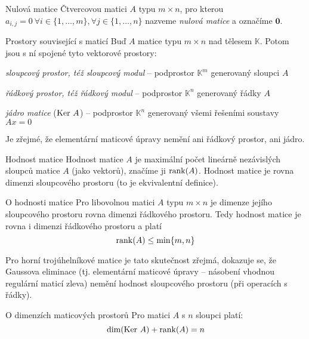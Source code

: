 \begin{definiceN}{Nulová matice}
Čtvercovou matici $A$ typu $m\times n$, pro kterou $a_{i,j}=0\ \forall i\in\{1,\dots,m\},\forall j\in\{1,\dots,n\}$ nazveme \emph{nulová matice} a označíme $\mathbf{0}$.
\end{definiceN}



\begin{definiceN}{Prostory související s maticí}
Buď $A$ matice typu $m\times n$ nad tělesem $\mathbb{K}$. Potom jsou s ní spojené tyto vektorové prostory:
\begin{pitemize}
    \item \emph{sloupcový prostor, též sloupcový modul} -- podprostor $\mathbb{K}^m$ generovaný sloupci $A$
    \item \emph{řádkový prostor, též řádkový modul} -- podprostor $\mathbb{K}^n$ generovaný řádky $A$
    \item \emph{jádro matice} ($\mathrm{Ker\ } A$) -- podprostor $\mathbb{K}^n$ generovaný všemi řešeními soustavy $Ax=0$
\end{pitemize}

\noindent Je zřejmé, že elementární maticové úpravy nemění ani řádkový prostor, ani jádro.
\end{definiceN}

\begin{definiceN}{Hodnost matice}
Hodnost matice $A$ je maximální počet lineárně nezávislých sloupců matice $A$ (jako vektorů), značíme ji $\mathrm{rank}(A)$. Hodnost matice je rovna dimenzi sloupcového prostoru (to je ekvivalentní definice).
\end{definiceN}

\begin{vetaN}{O hodnosti matice}
Pro libovolnou matici $A$ typu $m\times n$ je dimenze jejího sloupcového prostoru rovna dimenzi řádkového prostoru. Tedy hodnost matice je rovna i dimenzi řádkového prostoru a platí $$\mathrm{rank}(A)\leq\min\{m,n\}$$

\begin{dukaz}
Pro horní trojúhelníkové matice je tato skutečnost zřejmá, dokazuje se, že Gaussova eliminace (tj. elementární maticové úpravy -- násobení vhodnou regulární maticí zleva) nemění hodnost sloupcového prostoru (při operacích s řádky).
\end{dukaz}
\end{vetaN}

\begin{vetaN}{O dimenzích maticových prostorů}
Pro matici $A$ s $n$ sloupci platí:
$$\mathrm{dim}(\mathrm{Ker\ } A)+\mathrm{rank}(A)=n$$
\end{vetaN}

